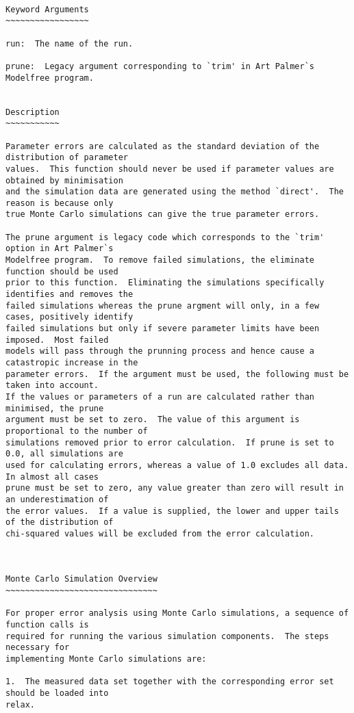 {\scriptsize
\begin{verbatim}

Keyword Arguments
~~~~~~~~~~~~~~~~~

run:  The name of the run.

prune:  Legacy argument corresponding to `trim' in Art Palmer`s Modelfree program.


Description
~~~~~~~~~~~

Parameter errors are calculated as the standard deviation of the distribution of parameter
values.  This function should never be used if parameter values are obtained by minimisation
and the simulation data are generated using the method `direct'.  The reason is because only
true Monte Carlo simulations can give the true parameter errors.

The prune argument is legacy code which corresponds to the `trim' option in Art Palmer`s
Modelfree program.  To remove failed simulations, the eliminate function should be used
prior to this function.  Eliminating the simulations specifically identifies and removes the
failed simulations whereas the prune argment will only, in a few cases, positively identify
failed simulations but only if severe parameter limits have been imposed.  Most failed
models will pass through the prunning process and hence cause a catastropic increase in the
parameter errors.  If the argument must be used, the following must be taken into account.
If the values or parameters of a run are calculated rather than minimised, the prune
argument must be set to zero.  The value of this argument is proportional to the number of
simulations removed prior to error calculation.  If prune is set to 0.0, all simulations are
used for calculating errors, whereas a value of 1.0 excludes all data.  In almost all cases
prune must be set to zero, any value greater than zero will result in an underestimation of
the error values.  If a value is supplied, the lower and upper tails of the distribution of
chi-squared values will be excluded from the error calculation.



Monte Carlo Simulation Overview
~~~~~~~~~~~~~~~~~~~~~~~~~~~~~~~

For proper error analysis using Monte Carlo simulations, a sequence of function calls is
required for running the various simulation components.  The steps necessary for
implementing Monte Carlo simulations are:

1.  The measured data set together with the corresponding error set should be loaded into
relax.


\end{verbatim}}
